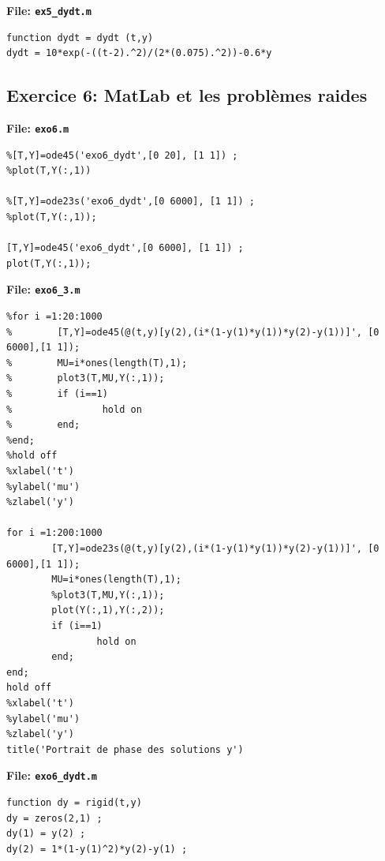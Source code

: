 \documentclass[a4paper,12pt,landscape]{article}
\begin{document}
\textbf{File: \texttt{ex5\_dydt.m}}
\begin{tiny}
\begin{verbatim}
function dydt = dydt (t,y)
dydt = 10*exp(-((t-2).^2)/(2*(0.075).^2))-0.6*y
\end{verbatim}
\end{tiny}

\subsection{Exercice 6: MatLab et les problèmes raides}
\textbf{File: \texttt{exo6.m}}
\begin{tiny}
\begin{verbatim}
%[T,Y]=ode45('exo6_dydt',[0 20], [1 1]) ;
%plot(T,Y(:,1))

%[T,Y]=ode23s('exo6_dydt',[0 6000], [1 1]) ;
%plot(T,Y(:,1));

[T,Y]=ode45('exo6_dydt',[0 6000], [1 1]) ;
plot(T,Y(:,1));
\end{verbatim}
\end{tiny}

\textbf{File: \texttt{exo6\_3.m}}
\begin{tiny}
\begin{verbatim}
%for i =1:20:1000
%        [T,Y]=ode45(@(t,y)[y(2),(i*(1-y(1)*y(1))*y(2)-y(1))]', [0 6000],[1 1]);
%        MU=i*ones(length(T),1);
%        plot3(T,MU,Y(:,1));
%        if (i==1)
%                hold on 
%        end;
%end;
%hold off
%xlabel('t')
%ylabel('mu')
%zlabel('y')

for i =1:200:1000
        [T,Y]=ode23s(@(t,y)[y(2),(i*(1-y(1)*y(1))*y(2)-y(1))]', [0 6000],[1 1]);
        MU=i*ones(length(T),1);
        %plot3(T,MU,Y(:,1));
        plot(Y(:,1),Y(:,2));
        if (i==1)
                hold on 
        end;
end;
hold off
%xlabel('t')
%ylabel('mu')
%zlabel('y')
title('Portrait de phase des solutions y')
\end{verbatim}
\end{tiny}

\textbf{File: \texttt{exo6\_dydt.m}}
\begin{tiny}
\begin{verbatim}
function dy = rigid(t,y)
dy = zeros(2,1) ;
dy(1) = y(2) ;
dy(2) = 1*(1-y(1)^2)*y(2)-y(1) ;
\end{verbatim}
\end{tiny}
\end{document}
